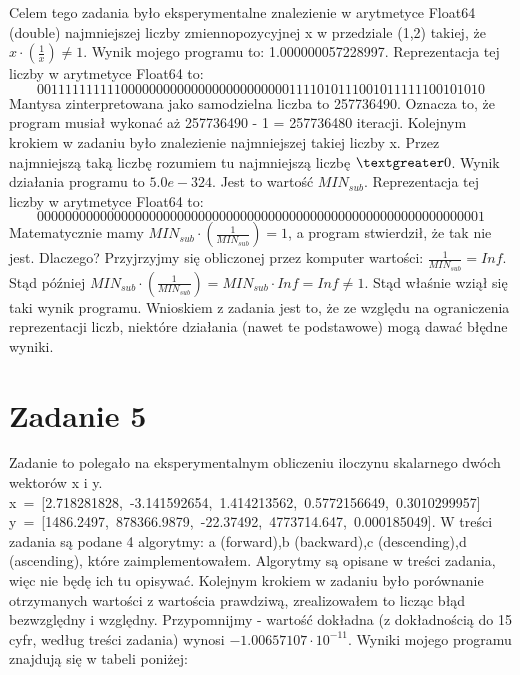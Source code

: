 \documentclass[]{article}
\begin{document}
	Celem tego zadania było eksperymentalne znalezienie w arytmetyce Float64 (double) najmniejszej liczby zmiennopozycyjnej x w przedziale (1,2) takiej, że \(x \cdot (\frac{1}{x}) \neq 1\). 
	Wynik mojego programu to: 1.000000057228997. Reprezentacja tej liczby w arytmetyce Float64 to: \newline 
	$$0 01111111111 0000000000000000000000001111010111001011111100101010$$
	Mantysa zinterpretowana jako samodzielna liczba to 257736490. Oznacza to, że program musiał wykonać aż 257736490 - 1 = 257736480 iteracji.
	Kolejnym krokiem w zadaniu było znalezienie najmniejszej takiej liczby x. Przez najmniejszą taką liczbę rozumiem tu najmniejszą liczbę $\textgreater 0$. Wynik działania programu to $5.0e-324$. Jest to wartość $MIN_{sub}$.  Reprezentacja tej liczby w arytmetyce Float64 to: \newline 
	$$0 00000000000 0000000000000000000000000000000000000000000000000001$$
	Matematycznie mamy \( MIN_{sub} \cdot (\frac{1}{MIN_{sub}}) = 1\), a program stwierdził, że tak nie jest. Dlaczego? Przyjrzyjmy się obliczonej przez komputer wartości: $\frac{1}{MIN_{sub}} = Inf$. Stąd później $MIN_{sub} \cdot(\frac{1}{MIN_{sub}}) = MIN_{sub} \cdot Inf = Inf \ne 1$. Stąd właśnie wziął się taki wynik programu. Wnioskiem z zadania jest to, że ze względu na ograniczenia reprezentacji liczb, niektóre działania (nawet te podstawowe) mogą dawać błędne wyniki.
	\clearpage
	
	\section*{Zadanie 5}
	Zadanie to polegało na eksperymentalnym obliczeniu iloczynu skalarnego dwóch wektorów x i y. \newline
	\mbox{x = [2.718281828, -3.141592654, 1.414213562, 0.5772156649, 0.3010299957]}\newline
	\mbox{y = [1486.2497, 878366.9879, -22.37492, 4773714.647, 0.000185049].}\newline
	W treści zadania są podane 4 algorytmy: \newline a (forward),b (backward),c (descending),d (ascending), które zaimplementowałem. Algorytmy są opisane w treści zadania, więc nie będę ich tu opisywać. Kolejnym krokiem w zadaniu było porównanie otrzymanych wartości z wartościa prawdziwą, zrealizowałem to licząc błąd bezwzględny i względny. Przypomnijmy - wartość dokładna (z dokładnością do 15 cyfr, według treści zadania) wynosi \(-1.00657107\cdot10^{-11}\). Wyniki mojego programu znajdują się w tabeli poniżej:
	
\end{document}
